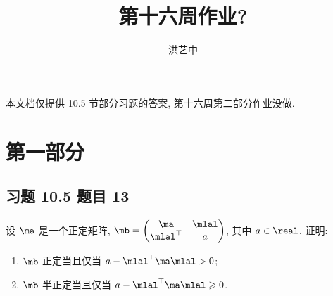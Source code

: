 \title{第十六周作业?}
\author{洪艺中}
\maketitle

本文档仅提供 10.5 节部分习题的答案, 第十六周第二部分作业没做.

\section{第一部分}
\newcommand{\lvec}[1]{\overrightarrow{#1}}
\newcommand{\mpp}{\mat{P}}
\newcommand{\muu}{\mat{U}}

\subsection*{ 习题 10.5 题目 13 }
\begin{problem*}
 设 $\ma$ 是一个正定矩阵, $\mb = \begin{pmatrix}
    \ma & \mlal \\
    \mlal^\top & a
\end{pmatrix}$, 其中 $a \in \real$. 证明:
\begin{enumerate}
    \item $\mb$ 正定当且仅当 $a - \mlal^\top \ma \mlal > 0$;
    \item $\mb$ 半正定当且仅当 $a - \mlal^\top \ma \mlal \geqslant 0$.
\end{enumerate}
\end{problem*}
